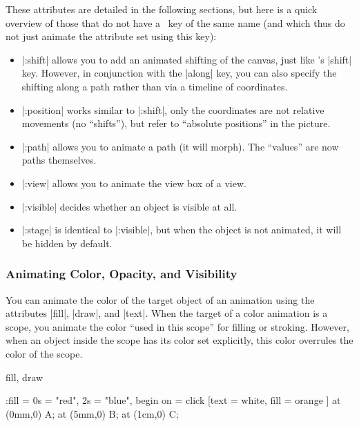 These attributes are detailed in the following sections, but here is a quick
overview of those that do not have a \tikzname\ key of the same name (and which
thus do not just animate the attribute set using this key):
%
\begin{itemize}
    \item |:shift| allows you to add an animated shifting of the canvas, just
        like \tikzname's |shift| key. However, in conjunction with the |along|
        key, you can also specify the shifting along a path rather than via a
        timeline of coordinates.
    \item |:position| works similar to |:shift|, only the coordinates are not
        relative movements (no ``shifts''), but refer to ``absolute positions''
        in the picture.
    \item |:path| allows you to animate a path (it will morph). The ``values''
        are now paths themselves.
    \item |:view| allows you to animate the view box of a view.
    \item |:visible| decides whether  an object is visible at all.
    \item |:stage| is identical to |:visible|, but when the object is not
        animated, it will be hidden by default.
\end{itemize}


\subsubsection{Animating Color, Opacity, and Visibility}
\label{section-animation-painting}

You can animate the color of the target object of an animation using the
attributes |fill|, |draw|, and |text|. When the target of a color animation is
a scope, you animate the color ``used in this scope'' for filling or stroking.
However, when an object inside the scope has its color set explicitly, this
color overrules the color of the scope.

\begin{tikzanimateattribute}{fill, draw}
\begin{codeexample}[
    preamble={\usetikzlibrary{animations}},
    animation list={0.5,1,1.5,2},
]
\tikz :fill = {0s = "red", 2s = "blue", begin on = click}
      [text = white, fill = orange ] {
  \node [fill]                   at (0mm,0) {A};
  \node [fill]                   at (5mm,0) {B};
  \node [fill = green!50!black ] at (1cm,0) {C};
}
\end{codeexample}
\end{tikzanimateattribute}

